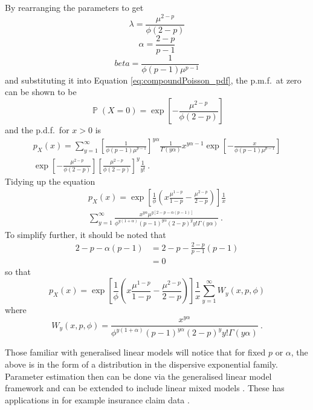 \documentclass[12pt, a4paper]{memoir}
\DeclareMathOperator{\prob}{\mathbb{P}}
\begin{document}
By rearranging the parameters to get
\begin{equation}
	\lambda=\frac{\mu^{2-p}}{\phi(2-p)}
\end{equation}
\begin{equation}
	\alpha=\frac{2-p}{p-1}
\end{equation}
\begin{equation}
	beta=\frac{1}{\phi(p-1)\mu^{p-1}}
\end{equation}
and substituting it into Equation \eqref{eq:compoundPoisson_pdf}, the p.m.f.~at zero can be shown to be
\begin{equation}
	\prob(X=0) = \exp
	\left[
	    -\frac{\mu^{2-p}}{\phi(2-p)}
	\right]
\end{equation}
and the p.d.f.~for $x>0$ is
\begin{multline*}
	p_X(x) = \sum_{y=1}^{\infty}
	\left[
		\frac{1}{\phi(p-1)\mu^{p-1}}
	\right]^{y\alpha}
	\frac{1}{\Gamma(y\alpha)}
	x^{y\alpha-1}
	\exp\left[
	    -\frac{x}{\phi(p-1)\mu^{p-1}}
	\right]
	\\
	\exp\left[
	    -\frac{\mu^{2-p}}{\phi(2-p)}
	\right]
	\left[
		\frac{\mu^{2-p}}{\phi(2-p)}
	\right]^y
	\frac{1}{y!}
	\ .
\end{multline*}
Tidying up the equation
\begin{multline*}
	p_X(x) = 
	\exp\left[
		\frac{1}{\phi}\left(x\frac{\mu^{1-p}}{1-p}-\frac{\mu^{2-p}}{2-p}\right)
	\right]
	\frac{1}{x}
	\\
	\sum_{y=1}^{\infty}\frac{x^{y\alpha}\mu^{y[2-p-\alpha(p-1)]}}{\phi^{y(1+\alpha)}(p-1)^{y\alpha}(2-p)^yy!\Gamma(y\alpha)}
	\ .
\end{multline*}
To simplify further, it should be noted that
\begin{align*}
	2-p-\alpha(p-1) &= 2-p - \frac{2-p}{p-1}(p-1)
	\\&=0
\end{align*}
so that
\begin{equation}
	p_X(x) = 
	\exp\left[
		\frac{1}{\phi}
		\left(
			x\frac{\mu^{1-p}}{1-p}-\frac{\mu^{2-p}}{2-p}
		\right)
	\right]
	\frac{1}{x}
	\sum_{y=1}^{\infty}W_y(x,p,\phi)
\end{equation}
where
\begin{equation}
	W_y(x,p,\phi)=\frac{x^{y\alpha}}{\phi^{y(1+\alpha)}(p-1)^{y\alpha}(2-p)^yy!\Gamma(y\alpha)}
	\ .
\end{equation}

Those familiar with generalised linear models \citep{nelder1972generalized} \citep{mccullagh1984generalized} will notice that for fixed $p$ or $\alpha$, the above is in the form of a distribution in the dispersive exponential family. Parameter estimation then can be done via the generalised linear model framework and can be extended to include linear mixed models \citep{zhang2013likelihood}. These has applications in for example insurance claim data \citep{jorgensen1994fitting} \citep{smyth2002fitting}.
\end{document}
